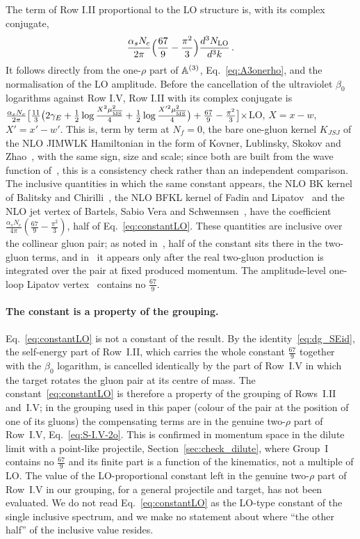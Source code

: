 The term of Row I.II proportional to the LO structure is, with its complex conjugate,
\begin{align}\label{eq:constantLO}
\frac{\alpha_sN_c}{2\pi}\Big(\frac{67}{9}-\frac{\pi^2}{3}\Big)\frac{d^3N_{\rm LO}}{d^3k}\,.
\end{align}
It follows directly from the one-$\rho$ part of $\mathbb{A}^{(3)}$, Eq.~\eqref{eq:A3onerho}, and the normalisation of the LO amplitude. Before the cancellation of the ultraviolet $\beta_0$ logarithms against Row I.V, Row I.II with its complex conjugate is $\frac{\alpha_sN_c}{2\pi}\big[\frac{11}{3}\big(2\gamma_E+\frac12\log\frac{X^2\mu^2_{\overline{\rm MS}}}{4}+\frac12\log\frac{X'^2\mu^2_{\overline{\rm MS}}}{4}\big)+\frac{67}{9}-\frac{\pi^2}{3}\big]\times$LO, $X=x-w$, $X'=x'-w'$. This is, term by term at $N_f=0$, the bare one-gluon kernel $K_{JSJ}$ of the NLO JIMWLK Hamiltonian in the form of Kovner, Lublinsky, Skokov and Zhao~\cite{Kovner:2023vsy}, with the same sign, size and scale; since both are built from the wave function of~\cite{Lublinsky:2016meo}, this is a consistency check rather than an independent comparison. The inclusive quantities in which the same constant appears, the NLO BK kernel of Balitsky and Chirilli~\cite{Balitsky:2007feb}, the NLO BFKL kernel of Fadin and Lipatov~\cite{Fadin:1998py} and the NLO jet vertex of Bartels, Sabio Vera and Schwennsen~\cite{Bartels:2006hg}, have the coefficient $\frac{\alpha_sN_c}{4\pi}(\frac{67}{9}-\frac{\pi^2}{3})$, half of Eq.~\eqref{eq:constantLO}. These quantities are inclusive over the collinear gluon pair; as noted in~\cite{Kovner:2023vsy}, half of the constant sits there in the two-gluon terms, and in~\cite{Fadin:1998py} it appears only after the real two-gluon production is integrated over the pair at fixed produced momentum. The amplitude-level one-loop Lipatov vertex~\cite{DelDuca:1998cx} contains no $\frac{67}{9}$.

\paragraph{The constant is a property of the grouping.} Eq.~\eqref{eq:constantLO} is not a constant of the result. By the identity~\eqref{eq:dg_SEid}, the self-energy part of Row~I.II, which carries the whole constant $\frac{67}{9}$ together with the $\beta_0$ logarithm, is cancelled identically by the part of Row~I.V in which the target rotates the gluon pair at its centre of mass. The constant~\eqref{eq:constantLO} is therefore a property of the grouping of Rows~I.II and~I.V; in the grouping used in this paper (colour of the pair at the position of one of its gluons) the compensating terms are in the genuine two-$\rho$ part of Row~I.V, Eq.~\eqref{eq:S-I.V-2o}. This is confirmed in momentum space in the dilute limit with a point-like projectile, Section~\ref{sec:check_dilute}, where Group~I contains no $\frac{67}{9}$ and its finite part is a function of the kinematics, not a multiple of LO. The value of the LO-proportional constant left in the genuine two-$\rho$ part of Row~I.V in our grouping, for a general projectile and target, has not been evaluated. We do not read Eq.~\eqref{eq:constantLO} as the LO-type constant of the single inclusive spectrum, and we make no statement about where ``the other half'' of the inclusive value resides.

